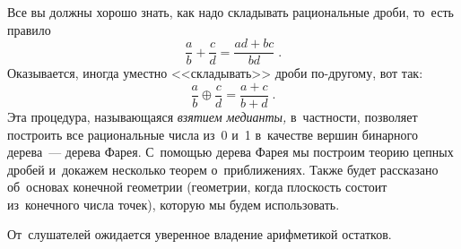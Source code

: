



Все вы должны хорошо знать, как надо складывать рациональные дроби, то~есть
правило
\[
    \frac{a}{b} + \frac{c}{d}
=
    \frac{a d + b c}{b d}
\; . \]
Оказывается, иногда уместно <<складывать>> дроби по-другому, вот так:
\[
    \frac{a}{b} \oplus \frac{c}{d}
=
    \frac{a + c}{b + d}
\; . \]
Эта процедура, называющаяся \emph{взятием медианты,} в~частности, позволяет
построить все рациональные числа из~0 и~1 в~качестве вершин бинарного
дерева~--- дерева Фарея.
С~помощью дерева Фарея мы построим теорию цепных дробей и~докажем несколько
теорем о~приближениях.
Также будет рассказано об~основах конечной геометрии
(геометрии, когда плоскость состоит из~конечного числа точек),
которую мы будем использовать.

От~слушателей ожидается уверенное владение арифметикой остатков.

